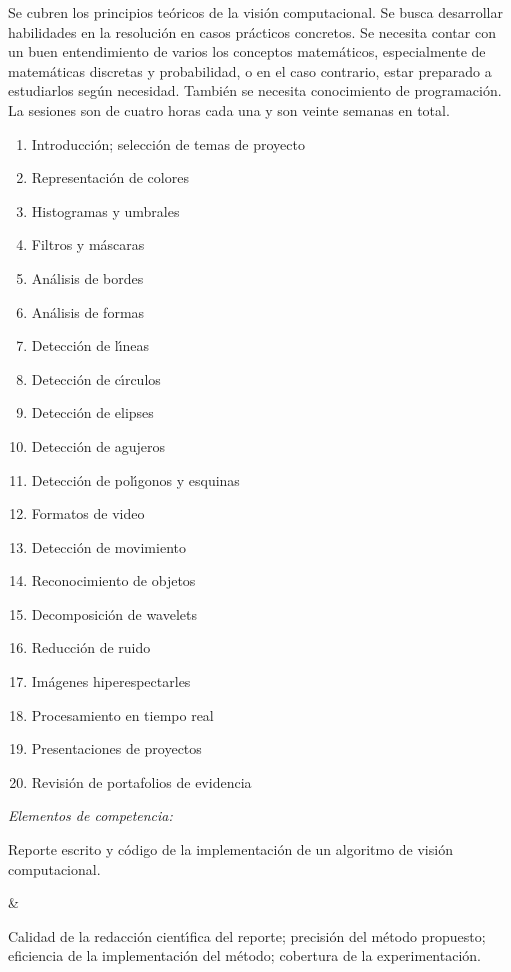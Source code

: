 \documentclass[10 pt]{article}
\begin{document}
Se cubren los principios te\'{o}ricos de la visi\'{o}n computacional.  Se
busca desarrollar habilidades en la resoluci\'{o}n en casos
pr\'{a}cticos concretos. Se necesita contar con un buen entendimiento
de varios los conceptos matem\'{a}ticos, especialmente de
matem\'{a}ticas discretas y probabilidad, o en el caso contrario,
estar preparado a estudiarlos seg\'{u}n necesidad. Tambi\'{e}n se
necesita conocimiento de programaci\'{o}n.  La sesiones son de cuatro
horas cada una y son veinte semanas en total.
\begin{enumerate}[itemsep=-3pt]
\item{Introducci\'{o}n; selecci\'{o}n de temas de proyecto}
\item{Representaci\'{o}n de colores}
\item{Histogramas y umbrales}
\item{Filtros y m\'{a}scaras}
\item{An\'{a}lisis de bordes}
\item{An\'{a}lisis de formas}
\item{Detecci\'{o}n de l\'{\i}neas}
\item{Detecci\'{o}n de c\'{\i}rculos}
\item{Detecci\'{o}n de elipses}
\item{Detecci\'{o}n de agujeros}
\item{Detecci\'{o}n de pol\'{\i}gonos y esquinas}
\item{Formatos de video}
\item{Detecci\'{o}n de movimiento}
\item{Reconocimiento de objetos}
\item{Decomposici\'{o}n de wavelets}
\item{Reducci\'{o}n de ruido}
\item{Im\'{a}genes hiperespectarles}
\item{Procesamiento en tiempo real}
\item{Presentaciones de proyectos}
\item{Revisi\'{o}n de portafolios de evidencia}
\end{enumerate}

{\em Elementos de competencia:}



Reporte escrito y c\'{o}digo de la implementaci\'{o}n de un algoritmo
de visi\'{o}n computacional.

&

Calidad de la redacci\'{o}n cient\'{\i}fica del reporte; precisi\'{o}n
del m\'{e}todo propuesto; eficiencia de la implementaci\'{o}n del
m\'{e}todo; cobertura de la experimentaci\'{o}n.
\end{document}
